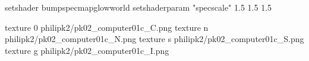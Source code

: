 setshader bumpspecmapglowworld
setshaderparam "specscale" 1.5 1.5 1.5


texture 0 philipk2/pk02_computer01c_C.png
texture n philipk2/pk02_computer01c_N.png
texture s philipk2/pk02_computer01c_S.png
texture g philipk2/pk02_computer01c_I.png

